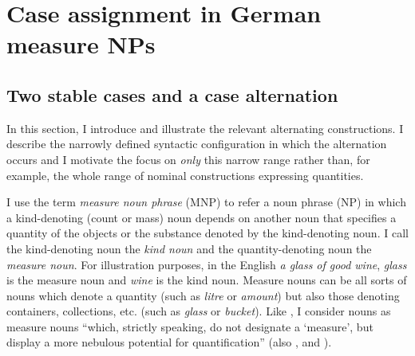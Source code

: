 \documentclass[USenglish]{article}
\begin{document}


\section{Case assignment in German measure NPs}
\label{sec:germanmeasurenps}


\subsection{Two stable cases and a case alternation}
\label{sec:descriptive}

In this section, I introduce and illustrate the relevant alternating constructions.
I describe the narrowly defined syntactic configuration in which the alternation occurs and I motivate the focus on \textit{only} this narrow range rather than, for example, the whole range of nominal constructions expressing quantities.

I use the term \textit{measure noun phrase} (MNP) to refer a noun phrase (NP) in which a kind-denoting (count or mass) noun depends on another noun that specifies a quantity of the objects or the substance denoted by the kind-denoting noun.
I call the kind-denoting noun the \textit{kind noun} and the quantity-denoting noun the \textit{measure noun}.
For illustration purposes, in the English \textit{a glass of good wine}, \textit{glass} is the measure noun and \textit{wine} is the kind noun.
Measure nouns can be all sorts of nouns which denote a quantity (such as \textit{litre} or \textit{amount}) but also those denoting containers, collections, etc. (such as \textit{glass} or \textit{bucket}).
Like \citet[284]{Brems2003}, I consider nouns as measure nouns ``which, strictly speaking, do not designate a `measure', but display a more nebulous potential for quantification'' (also \citealp[530]{Koptjevskaja2001}, and \citealp[338]{Rutkowski2007}).
\end{document}
